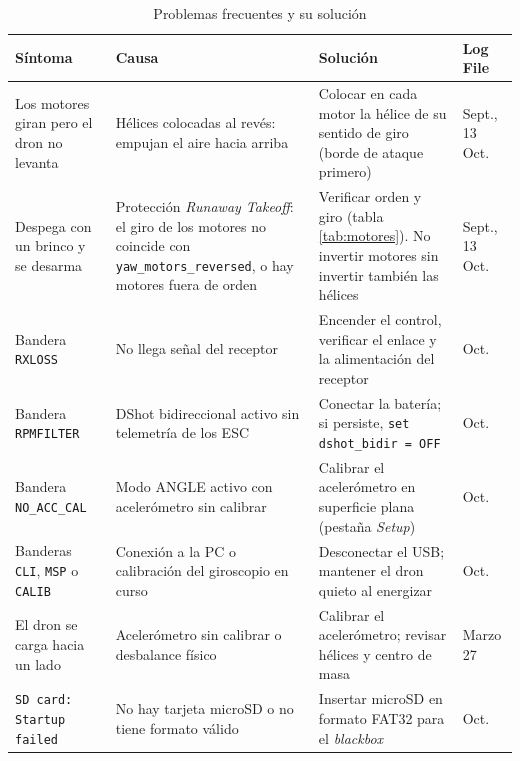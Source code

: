\documentclass[11pt,letterpaper]{article}
\begin{document}
\begin{table}[!h]
\centering
\caption{Problemas frecuentes y su solución}
\label{tab:problemas}
\small
\begin{tabularx}{\textwidth}{@{}>{\raggedright\arraybackslash}p{3.2cm}>{\raggedright\arraybackslash}X>{\raggedright\arraybackslash}X>{\raggedright\arraybackslash}p{2.1cm}@{}}
\toprule
\textbf{Síntoma} & \textbf{Causa} & \textbf{Solución} & \textbf{Log File} \\
\midrule
Los motores giran pero el dron no levanta &
Hélices colocadas al revés: empujan el aire hacia arriba &
Colocar en cada motor la hélice de su sentido de giro (borde de ataque primero) &
Sept., 13 Oct. \\
\addlinespace
Despega con un brinco y se desarma &
Protección \textit{Runaway Takeoff}: el giro de los motores no coincide con \texttt{yaw\_motors\_reversed}, o hay motores fuera de orden &
Verificar orden y giro (tabla \ref{tab:motores}). No invertir motores sin invertir también las hélices &
Sept., 13 Oct. \\
\addlinespace
Bandera \texttt{RXLOSS} &
No llega señal del receptor &
Encender el control, verificar el enlace y la alimentación del receptor &
13 Oct. \\
\addlinespace
Bandera \texttt{RPMFILTER} &
DShot bidireccional activo sin telemetría de los ESC &
Conectar la batería; si persiste, \texttt{set dshot\_bidir = OFF} &
13 Oct. \\
\addlinespace
Bandera \texttt{NO\_ACC\_CAL} &
Modo ANGLE activo con acelerómetro sin calibrar &
Calibrar el acelerómetro en superficie plana (pestaña \textit{Setup}) &
13 Oct. \\
\addlinespace
Banderas \texttt{CLI}, \texttt{MSP} o \texttt{CALIB} &
Conexión a la PC o calibración del giroscopio en curso &
Desconectar el USB; mantener el dron quieto al energizar &
13 Oct. \\
\addlinespace
El dron se carga hacia un lado &
Acelerómetro sin calibrar o desbalance físico &
Calibrar el acelerómetro; revisar hélices y centro de masa &
Marzo 27 \\
\addlinespace
\texttt{SD card: Startup failed} &
No hay tarjeta microSD o no tiene formato válido &
Insertar microSD en formato FAT32 para el \textit{blackbox} &
13 Oct. \\
\bottomrule
\end{tabularx}
\end{table}

\end{document}
